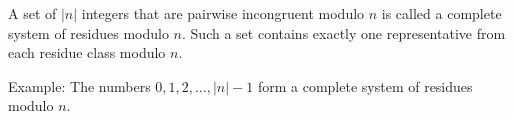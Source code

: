 A set of $|n|$ integers that are pairwise incongruent modulo $n$ is called a complete system of residues modulo $n$. Such a set contains exactly one representative from each residue class modulo $n$.

Example: The numbers $0, 1, 2, \ldots, |n| - 1$ form a complete system of residues modulo $n$.
